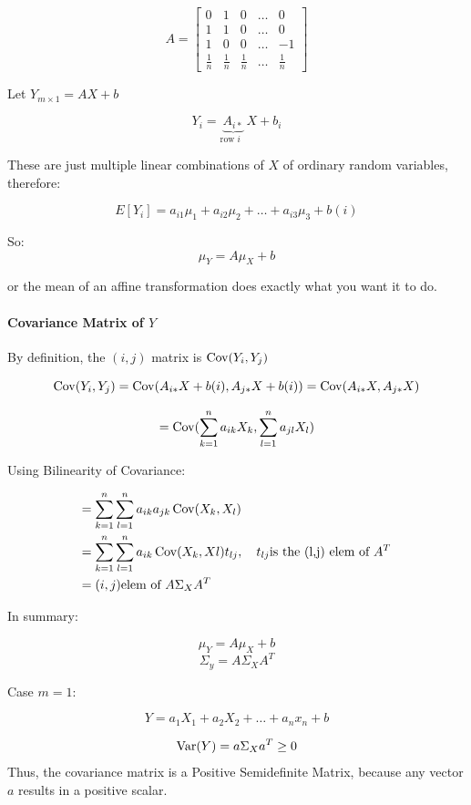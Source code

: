 \documentclass{report}
\begin{document}
\[
	A = 
\begin{bmatrix}
	0 &1 &0  &\dots &0\\
	1 &1 &0  &\dots &0\\
	1 &0 &0  &\dots &-1\\
	\frac{1}{n} &\frac{1}{n} &\frac{1}{n} &\dots &\frac{1}{n}
\end{bmatrix}
\]

Let $Y_{m\times 1} = AX + b$  

\[
	Y_{i} = \underbrace{A_{i*}}_{\text{row $i$ }}X+ b_{i}
\]

These are just multiple linear combinations of $X$ of ordinary random variables, therefore: 

\[
	E[Y_{i}] = a_{i1}\mu_{1} + a_{i2}\mu _{2} + \dots + a_{i3}\mu _{3} + b(i) 
\]

So: 
\[
\mu _{Y} = A\mu _{X} + b
\]

or the mean of an affine transformation does exactly what you want it to do. 

\paragraph{
Covariance Matrix of $Y$}

By definition, the $(i,j)$ matrix is $\operatorname{Cov}(Y_i, Y_j) $ 



\[
\operatorname{Cov}(Y_{i}, Y_j) = \operatorname{Cov}(A_{i*} X + b(i), A_{j*}X + b(i)) =\operatorname{Cov}(A_{i*}X, A_{j*}X)
\]

\[
= \operatorname{Cov}(\sum_{k=1}^{n}a_{ik} X_{k}, \sum_{l=1}^{n}a_{jl}X_{l})
\]

Using Bilinearity of Covariance:

\begin{align*}
&= \sum_{k=1}^{n}\sum_{l=1}^{n} a_{ik} a_{jk} \operatorname{Cov}(X_k, X_{l})\\
&= \sum_{k=1}^{n} \sum_{l=1}^{n}a_{ik} \operatorname{Cov}(X_k, Xl)t_{lj}, \quad t_{lj} \text{is the (l,j) elem of $A^{T}$ } \\
&= (i,j) \text{elem of } A\Sigma_{X}A^{T} \\
\end{align*}


In summary:

\[
\mu _{Y} = A\mu _{X} + b
\]
\[
\Sigma_{y} = A \Sigma_{X} A^{T}
\]

Case $m=1$: 

\[
Y = a_{1} X_{1} + a_{2}X_2 + \dots + a_{n}x_{n} + b
\]

\[
\operatorname{Var}(Y) = a \Sigma_{X} a^{T} \ge 0 
\]
Thus, the covariance matrix is a Positive Semidefinite Matrix, because any vector $a$ results in a positive scalar.
\end{document}
